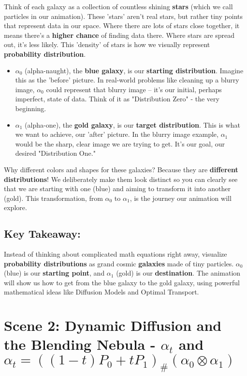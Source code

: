 \documentclass{article}
\begin{document}
Think of each galaxy as a collection of countless shining \textbf{stars} (which we call particles in our animation).  These 'stars' aren't real stars, but rather tiny points that represent data in our space. Where there are lots of stars close together, it means there's a \textbf{higher chance} of finding data there. Where stars are spread out, it's less likely.  This 'density' of stars is how we visually represent \textbf{probability distribution}.

\begin{itemize}
    \item \textbf{\( \alpha_0 \)} (alpha-naught), the \textbf{blue galaxy}, is our \textbf{starting distribution}. Imagine this as the 'before' picture. In real-world problems like cleaning up a blurry image, \( \alpha_0 \) could represent that blurry image – it's our initial, perhaps imperfect, state of data.  Think of it as "Distribution Zero" - the very beginning.
    \item \textbf{\( \alpha_1 \)} (alpha-one), the \textbf{gold galaxy}, is our \textbf{target distribution}. This is what we want to achieve, our 'after' picture. In the blurry image example, \( \alpha_1 \) would be the sharp, clear image we are trying to get. It's our goal, our desired "Distribution One."
\end{itemize}


Why different colors and shapes for these galaxies? Because they are \textbf{different distributions}!  We deliberately make them look distinct so you can clearly see that we are starting with one (blue) and aiming to transform it into another (gold).  This transformation, from \( \alpha_0 \) to \( \alpha_1 \), is the journey our animation will explore.

\subsection*{Key Takeaway:}

Instead of thinking about complicated math equations right away, visualize \textbf{probability distributions} as grand cosmic \textbf{galaxies} made of tiny particles.  \textbf{\( \alpha_0 \)} (blue) is our \textbf{starting point}, and \textbf{\( \alpha_1 \)} (gold) is our \textbf{destination}.  The animation will show us how to get from the blue galaxy to the gold galaxy, using powerful mathematical ideas like Diffusion Models and Optimal Transport.

\hrulefill

\section*{Scene 2: Dynamic Diffusion and the Blending Nebula - \( \alpha_t \) and \( \alpha_t = ((1 - t)P_0 + tP_1)_{\#} (\alpha_0 \otimes \alpha_1) \)}
\end{document}
